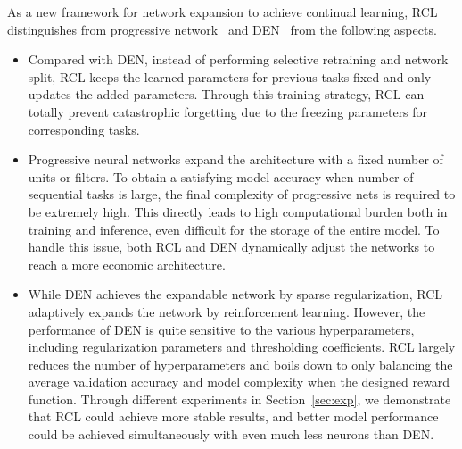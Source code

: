 \documentclass{article}
\begin{document}

As a new framework for network expansion to achieve continual learning, RCL distinguishes from progressive network~\cite{rusu1} and DEN~\cite{yoon1} from the following aspects. 
\begin{itemize}
\item Compared with DEN, instead of performing selective retraining and network split,  RCL keeps the learned parameters for previous tasks fixed and only updates the added parameters. Through this training strategy, RCL can totally prevent catastrophic forgetting due to the freezing parameters for corresponding tasks. 
\item Progressive neural networks expand the architecture with a fixed number of units or filters. To obtain a satisfying model accuracy when number of sequential tasks is large, the final complexity of progressive nets is required to be extremely high. This directly leads to high computational burden both in training and inference, even difficult for the storage of the entire model. To handle this issue, both RCL and DEN dynamically adjust the networks to reach a more economic architecture.  
\item While DEN achieves the expandable network by sparse regularization, RCL adaptively expands the network by reinforcement learning. 
However, the performance of DEN is quite sensitive to the various hyperparameters, including regularization parameters and thresholding coefficients. RCL largely reduces the number of hyperparameters and boils down to only balancing the average validation accuracy and model complexity when the designed reward function.  Through different experiments in Section~\ref{sec:exp}, we demonstrate that RCL could achieve more stable results, and better model performance could be achieved simultaneously with even much less neurons than DEN.
\end{itemize}
\end{document}

